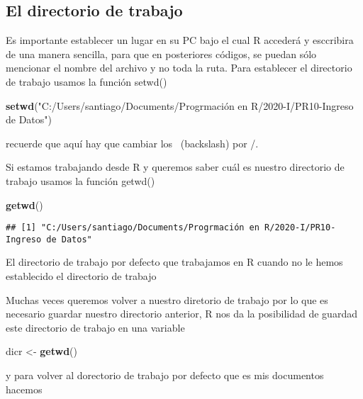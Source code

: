 \documentclass[]{article}
\newenvironment{Shaded}{\begin{snugshade}}{\end{snugshade}}
\newcommand{\KeywordTok}[1]{\textcolor[rgb]{0.13,0.29,0.53}{\textbf{#1}}}
\newcommand{\StringTok}[1]{\textcolor[rgb]{0.31,0.60,0.02}{#1}}
\newcommand{\NormalTok}[1]{#1}
\begin{document}
\subsection{El directorio de trabajo}\label{el-directorio-de-trabajo}

Es importante establecer un lugar en su PC bajo el cual R accederá y
esccribira de una manera sencilla, para que en posteriores códigos, se
puedan sólo mencionar el nombre del archivo y no toda la ruta. Para
establecer el directorio de trabajo usamos la función setwd()

\begin{Shaded}
\begin{Highlighting}[]
\KeywordTok{setwd}\NormalTok{(}\StringTok{"C:/Users/santiago/Documents/Progrmación en R/2020-I/PR10-Ingreso de Datos"}\NormalTok{)}
\end{Highlighting}
\end{Shaded}

recuerde que aquí hay que cambiar los ~(backslash) por /.

Si estamos trabajando desde R y queremos saber cuál es nuestro
directorio de trabajo usamos la función getwd()

\begin{Shaded}
\begin{Highlighting}[]
\KeywordTok{getwd}\NormalTok{()}
\end{Highlighting}
\end{Shaded}

\begin{verbatim}
## [1] "C:/Users/santiago/Documents/Progrmación en R/2020-I/PR10-Ingreso de Datos"
\end{verbatim}

El directorio de trabajo por defecto que trabajamos en R cuando no le
hemos establecido el directorio de trabajo

Muchas veces queremos volver a nuestro diretorio de trabajo por lo que
es necesario guardar nuestro directorio anterior, R nos da la
posibilidad de guardad este directorio de trabajo en una variable

\begin{Shaded}
\begin{Highlighting}[]
\NormalTok{dicr <-}\StringTok{ }\KeywordTok{getwd}\NormalTok{()}
\end{Highlighting}
\end{Shaded}

y para volver al dorectorio de trabajo por defecto que es mis documentos
hacemos
\end{document}
